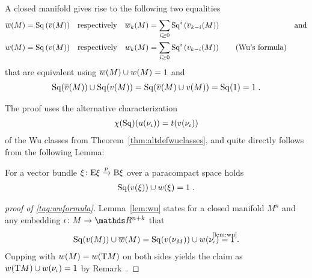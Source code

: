 \begin{Thm}[Wu]\label{thm:wu}
  A closed manifold gives rise to the following two equalities
  \begin{align}\notag
    {\overline{w}}(M) &= \mathrm{Sq}\left({\overline{v}}(M)\right)
    &\text{respectively}&
    &{\overline{w}_{k}}(M) &= \sum_{i\geq0} \mathrm{Sq}^{i}\left({\overline{v}_{k-i}}(M)\right)
    &\text{and}
    \\
    {w}(M) &= \mathrm{Sq}\left({v}(M)\right)
    &\text{respectively}&
    &{w_{k}}(M) &= \sum_{i\geq0} \mathrm{Sq}^{i}\left({v_{k-i}}(M)\right)
    \label{tag:wuformula}\tag{Wu's formula}
  \end{align}
  that are equivalent using
  ${\overline{w}}(M)\cup{w}(M) = 1$ and
  \begin{gather*}
    \mathrm{Sq}({\overline{v}}(M))\cup\mathrm{Sq}({v}(M))
    = \mathrm{Sq}({\overline{v}}(M)\cup{v}(M))
    = \mathrm{Sq}(1)
    = 1
    \;.
  \end{gather*}
\end{Thm}
The proof uses the alternative characterization
\begin{gather*}
  \chi(\mathrm{Sq})({u}(\nu_{{\iota}})) = t({v}(\nu_{{\iota}}))
\end{gather*}
of the Wu classes from Theorem~\ref{thm:altdefwuclasses}, and quite directly
follows from the following Lemma:
\begin{Lem}\label{lem:wu}
  For a vector bundle $\xi\colon \mathrm{E}\xi\xrightarrow{p}\mathrm{B}\xi$ over a
  paracompact space holds
  \begin{gather*}
    \mathrm{Sq}({v}(\xi)) \cup {w}(\xi)= 1
    \;.
  \end{gather*}
\end{Lem}
\begin{proof}[proof of \ref{tag:wuformula}]
  Lemma~\ref{lem:wu} states for a closed manifold $M^n$ and any
  embedding $\emb\colon M\to\R^{n+k}$ that
  \begin{gather*}
    \SQ(\V{M}) \cup \dualW{M}
    = \SQ(\V{\N M}) \cup \W{\N{\emb}}
    \cequalsby{\ref{lem:wu}} 1
    \;.
  \end{gather*}
  Cupping with ${w}(M)={w}(\mathrm{T}M)$ on both sides yields the claim
  as ${w}(\mathrm{T}M) \cup {w}(\nu_{{\iota}}) = 1$ by
  Remark~.
\end{proof}
